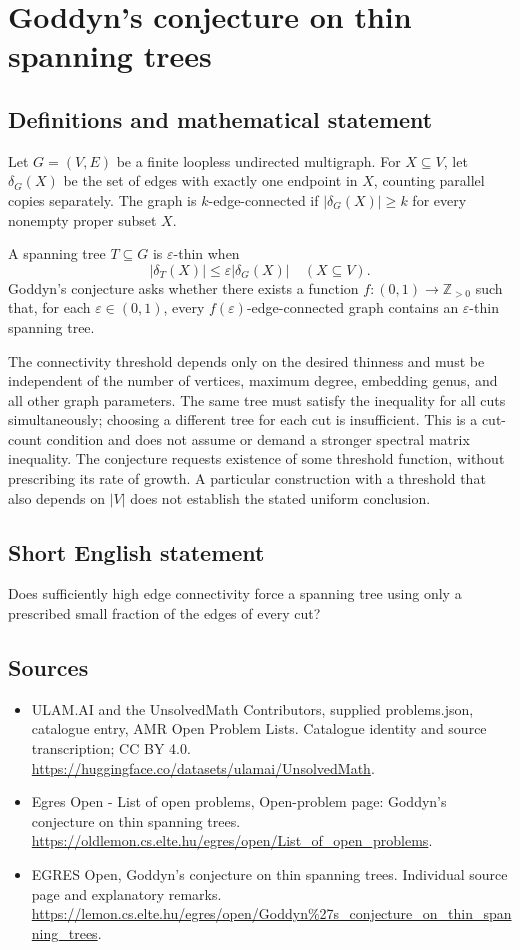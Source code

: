 \documentclass[11pt,a4paper]{article}
\begin{document}
\section*{Goddyn's conjecture on thin spanning trees}\label{statement}

\subsection{Definitions and mathematical statement}
Let $G=(V,E)$ be a finite loopless undirected multigraph. For
$X\subseteq V$, let $\delta_G(X)$ be the set of edges with exactly
one endpoint in $X$, counting parallel copies separately. The graph
is $k$-edge-connected if $|\delta_G(X)|\ge k$ for every nonempty proper
subset $X$.

A spanning tree $T\subseteq G$ is $\varepsilon$-thin when
\[
                         |\delta_T(X)|\le\varepsilon|\delta_G(X)|
                                            \quad(X\subseteq V).
\]
Goddyn's conjecture asks whether there exists a function
$f:(0,1)\to\mathbb Z_{>0}$ such that, for each $\varepsilon\in(0,1)$,
every $f(\varepsilon)$-edge-connected graph contains an
$\varepsilon$-thin spanning tree.

The connectivity threshold depends only on the desired thinness and
must be independent of the number of vertices, maximum degree,
embedding genus, and all other graph parameters. The same tree must
satisfy the inequality for all cuts simultaneously; choosing a different
tree for each cut is insufficient. This is a cut-count condition and
does not assume or demand a stronger spectral matrix inequality.
The conjecture requests existence of some threshold function, without
prescribing its rate of growth. A particular construction with a
threshold that also depends on $|V|$ does not establish the stated
uniform conclusion.
\subsection{Short English statement}
Does sufficiently high edge connectivity force a spanning tree
using only a prescribed small fraction of the edges of every cut?
\subsection{Sources}
\begin{itemize}
\item[S1] ULAM.AI and the UnsolvedMath Contributors, supplied problems.json, catalogue entry, AMR Open Problem Lists. Catalogue identity and source transcription; CC BY 4.0.
\url{https://huggingface.co/datasets/ulamai/UnsolvedMath}.
\item[S2] Egres Open - List of open problems, Open-problem page: Goddyn's conjecture on thin spanning trees. 
\url{https://oldlemon.cs.elte.hu/egres/open/List_of_open_problems}.
\item[S3] EGRES Open, Goddyn's conjecture on thin spanning trees. Individual source page and explanatory remarks.
\url{https://lemon.cs.elte.hu/egres/open/Goddyn%27s_conjecture_on_thin_spanning_trees}.
\end{itemize}
\end{document}
